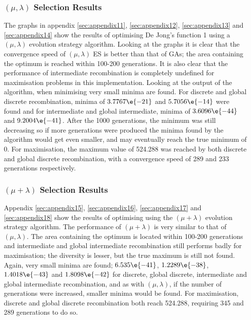 \subsubsection{$(\mu,\lambda)$ Selection Results}
The graphs in appendix \ref{sec:appendix11}, \ref{sec:appendix12}, \ref{sec:appendix13} and \ref{sec:appendix14} show the results of optimising De Jong's function 1 using a $(\mu,\lambda)$ evolution strategy algorithm. Looking at the graphs it is clear that the convergence speed of $(\mu,\lambda)$ ES is better than that of GAs; the area containing the optimum is reached within 100-200 generations. It is also clear that the performance of intermediate recombination is completely undefined for maximisation problems in this implementation. Looking at the output of the algorithm, when minimising very small minima are found. For discrete and global discrete recombination, minima of $3.7767\e{-21}$ and $5.7056\e{-14}$ were found and for intermediate and global intermediate, minima of $3.6096\e{-44}$ and $9.2004\e{-41}$. After the 1000 generations, the minimum was still decreasing so if more generations were produced the minima found by the algorithm would get even smaller, and may eventually reach the true minimum of 0. For maximisation, the maximum value of 524.288 was reached by both discrete and global discrete recombination, with a convergence speed of 289 and 233 generations respectively.

\subsubsection{$(\mu+\lambda)$ Selection Results}
Appendix \ref{sec:appendix15}, \ref{sec:appendix16}, \ref{sec:appendix17} and \ref{sec:appendix18} show the results of optimising using the $(\mu+\lambda)$ evolution strategy algorithm. The performance of $(\mu+\lambda)$ is very similar to that of $(\mu,\lambda)$. The area containing the optimum is located within 100-200 generations and intermediate and global intermediate recombination still performs badly for maximisation; the diversity is lesser, but the true maximum is still not found. Again, very small minima are found; $6.535\e{-41}$, $1.2289\e{-38}$, $1.4018\e{-43}$ and $1.8098\e{-42}$ for discrete, global discrete, intermediate and global intermediate recombination, and as with $(\mu,\lambda)$, if the number of generations were increased, smaller minima would be found. For maximisation, discrete and global discrete recombination both reach 524.288, requiring 345 and 289 generations to do so.

